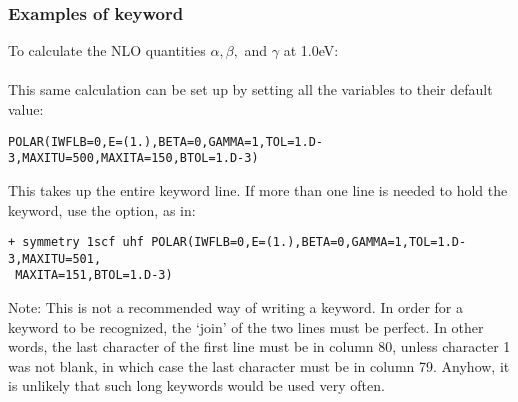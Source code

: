 \subsubsection*{Examples of  keyword}

To calculate the NLO quantities $\alpha, \beta,$ and $\gamma$ at 1.0eV:\\
  \\
This same calculation can be set up by setting all the variables to their
default value:
\begin{verbatim}
POLAR(IWFLB=0,E=(1.),BETA=0,GAMMA=1,TOL=1.D-3,MAXITU=500,MAXITA=150,BTOL=1.D-3)
\end{verbatim}

This takes up the entire keyword line.  If more than one line is needed to hold
the keyword, use the \comp{+} option, as in:
\begin{verbatim}
+ symmetry 1scf uhf POLAR(IWFLB=0,E=(1.),BETA=0,GAMMA=1,TOL=1.D-3,MAXITU=501,
 MAXITA=151,BTOL=1.D-3)
\end{verbatim}

Note: This is not a recommended way of writing a keyword.  In order for a
keyword to be recognized, the `join' of the two lines must be perfect.  In
other words, the last character of the first line must be in column 80, unless
character 1 was not blank, in which case the last character must be in column
79. Anyhow, it is unlikely that such long keywords would be used very often.



